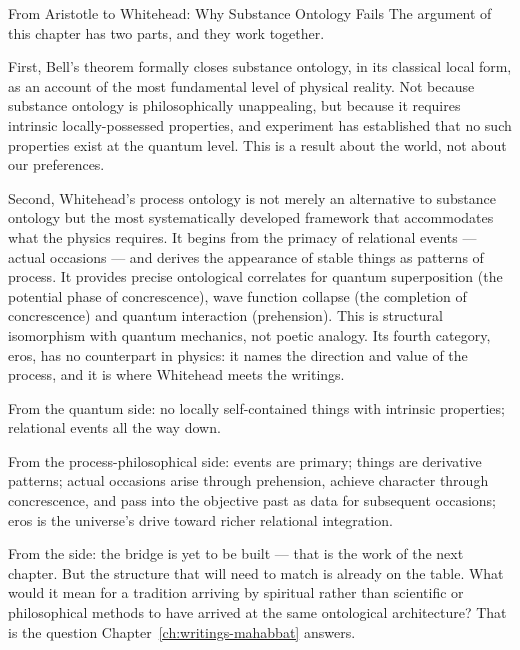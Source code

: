 \begin{convergencemoment}{From Aristotle to Whitehead: Why Substance Ontology Fails}
The argument of this chapter has two parts, and they work together.

First, Bell's theorem formally closes substance ontology, in its classical local form, as an account of the most fundamental level of physical reality. Not because substance ontology is philosophically unappealing, but because it requires intrinsic locally-possessed properties, and experiment has established that no such properties exist at the quantum level. This is a result about the world, not about our preferences.

Second, Whitehead's process ontology is not merely an alternative to substance ontology but the most systematically developed framework that accommodates what the physics requires. It begins from the primacy of relational events --- actual occasions --- and derives the appearance of stable things as patterns of process. It provides precise ontological correlates for quantum superposition (the potential phase of concrescence), wave function collapse (the completion of concrescence) and quantum interaction (prehension). This is structural isomorphism with quantum mechanics, not poetic analogy. Its fourth category, eros, has no counterpart in physics: it names the direction and value of the process, and it is where Whitehead meets the \bahai writings.

From the quantum side: no locally self-contained things with intrinsic properties; relational events all the way down.

From the process-philosophical side: events are primary; things are derivative patterns; actual occasions arise through prehension, achieve character through concrescence, and pass into the objective past as data for subsequent occasions; eros is the universe's drive toward richer relational integration.

From the \bahai side: the bridge is yet to be built --- that is the work of the next chapter. But the structure that will need to match is already on the table. What would it mean for a tradition arriving by spiritual rather than scientific or philosophical methods to have arrived at the same ontological architecture? That is the question Chapter~\ref{ch:writings-mahabbat} answers.
\end{convergencemoment}
